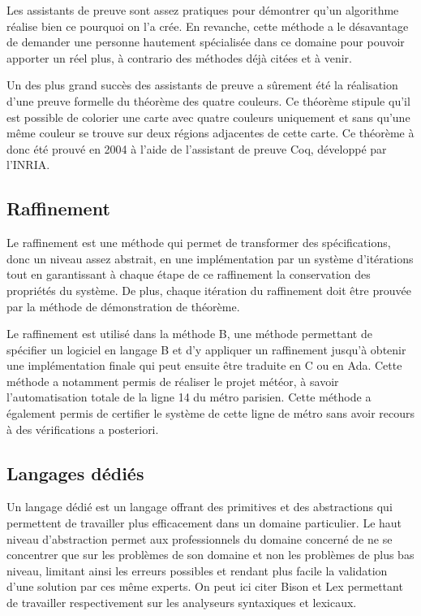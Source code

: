 \documentclass[12pt]{report}
\begin{document}
Les assistants de preuve sont assez pratiques pour démontrer qu'un algorithme réalise bien ce pourquoi on l'a crée. En revanche, cette méthode a le désavantage de demander une personne hautement spécialisée dans ce domaine pour pouvoir apporter un réel plus, à contrario des méthodes déjà citées et à venir\cite{griffault}.

Un des plus grand succès des assistants de preuve a sûrement été la réalisation d'une preuve formelle du théorème des quatre couleurs. Ce théorème stipule qu'il est possible de colorier une carte avec quatre couleurs uniquement et sans qu'une même couleur se trouve sur deux régions adjacentes de cette carte. Ce théorème à donc été prouvé en 2004 à l'aide de l'assistant de preuve Coq, développé par l'INRIA\cite{delahaye}.     

\subsection{Raffinement}

Le raffinement est une méthode qui permet de transformer des spécifications, donc un niveau assez abstrait, en une implémentation par un système d'itérations tout en garantissant à chaque étape de ce raffinement la conservation des propriétés du système. De plus, chaque itération du raffinement doit être prouvée par la méthode de démonstration de théorème.

Le raffinement est utilisé dans la méthode B, une méthode permettant de spécifier un logiciel en langage B et d'y appliquer un raffinement jusqu'à obtenir une implémentation finale qui peut ensuite être traduite en C ou en Ada. Cette méthode a notamment permis de réaliser le projet météor, à savoir l'automatisation totale de la ligne 14 du métro parisien. Cette méthode a également permis de certifier le système de cette ligne de métro sans avoir recours à des vérifications a posteriori\cite{griffault}.   
   
\subsection{Langages dédiés}
Un langage dédié est un langage offrant des primitives et des abstractions qui permettent de travailler plus efficacement dans un domaine particulier. Le haut niveau d'abstraction permet aux professionnels du domaine concerné de ne se concentrer que sur les problèmes de son domaine et non les problèmes de plus bas niveau, limitant ainsi les erreurs possibles et rendant plus facile la validation d'une solution par ces même experts\cite{Deuklvi}. On peut ici citer Bison et Lex permettant de travailler respectivement sur les analyseurs syntaxiques et lexicaux.
\end{document}
